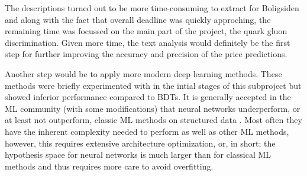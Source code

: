 The descriptions turned out to be more time-consuming to extract for Boligsiden and along with the fact that overall deadline was quickly approching, the remaining time was focussed on the main part of the project, the quark gluon discrimination. Given more time, the text analysis would definitely be the first step for further improving the accuracy and precision of the price predictions. 

Another step would be to apply more modern deep learning methods. These methods were briefly experimented with in the intial stages of this subproject but showed inferior performance compared to BDTs. It is generally accepted in the ML community (with some modifications) that neural networks underperform, or at least not outperform, classic ML methods on structured  data \autocite{klambauerSelfNormalizingNeuralNetworks2017}. Most often they have the inherent complexity needed to perform as well as other ML methods, however, this requires extensive architecture optimization, or, in short; the hypothesis space for neural networks is much larger than for classical ML methods and thus requires more care to avoid overfitting.